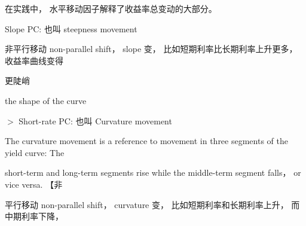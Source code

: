 \hspace*{3em} 在实践中， 水平移动因子解释了收益率总变动的大部分。

\hspace*{2em} Slope PC: 也叫 steepness movement

\hspace*{3em} 非平行移动 non-parallel shift， slope 变， 比如短期利率比长期利率上升更多， 收益率曲线变得

\hspace*{3em} 更陡峭

\hspace*{3em} the shape of the curve

\hspace*{1em} \(>\) Short-rate PC: 也叫 Curvature movement

\hspace*{1em} The curvature movement is a reference to movement in three segments of the yield curve: The

\hspace*{3em} short-term and long-term segments rise while the middle-term segment falls， or vice versa. 【非

\hspace*{3em} 平行移动 non-parallel shift， curvature 变， 比如短期利率和长期利率上升， 而中期利率下降，



\begin{center}
\end{center}








